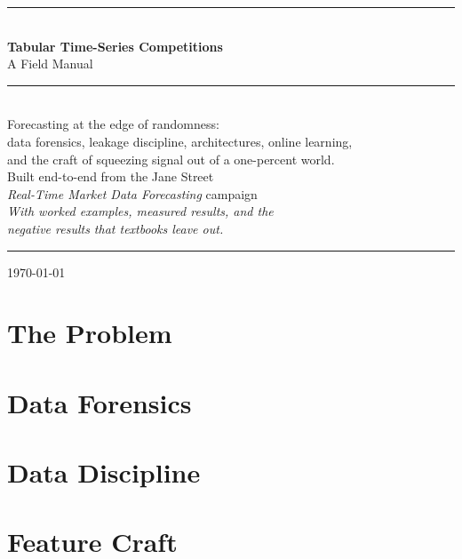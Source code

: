 \documentclass[11pt,oneside]{book}
\begin{document}
\frontmatter
\begin{titlepage}
\centering
{\color{inkblue}\rule{\textwidth}{2pt}}\\[26pt]
{\Huge\bfseries Tabular Time-Series Competitions}\\[10pt]
{\LARGE A Field Manual}\\[26pt]
{\color{inkblue}\rule{0.5\textwidth}{1pt}}\\[26pt]
{\large Forecasting at the edge of randomness:\\
data forensics, leakage discipline, architectures, online learning,\\
and the craft of squeezing signal out of a one-percent world.}\\[40pt]
{\large Built end-to-end from the Jane Street\\
\emph{Real-Time Market Data Forecasting} campaign}\\[60pt]
{\large\itshape With worked examples, measured results, and the\\
negative results that textbooks leave out.}\\[40pt]
{\color{inkblue}\rule{\textwidth}{2pt}}
\vfill
{\large \today}
\end{titlepage}


\tableofcontents

\mainmatter

\part{The Problem}



\part{Data Forensics}



\part{Data Discipline}





\part{Feature Craft}


\end{document}
